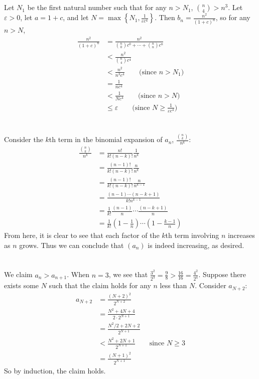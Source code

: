 \documentclass[11pt]{article}
\let\ep\varepsilon
\begin{document}
\renewcommand{\thesubsection}{\thesection.\alph{subsection}}
\section{} %
Let $N_1$ be the first natural number such that for any $n>N_1$, $\binom{n}{4}>n^3$.
Let $\ep>0$, let $a=1+c$, and let $N=\max\left\{N_1, \frac{1}{\ep c^4}\right\}$.
Then $b_n=\frac{n^2}{(1+c)^n}$, so for any $n>N$,
\begin{align*}
	\frac{n^2}{(1+c)^n}&=\frac{n^2}{\binom{n}{0}c^0+\cdots+\binom{n}{n}c^n}\\
					   &<\frac{n^2}{\binom{n}{4}c^4}\\
					   &<\frac{n^2}{n^3c^4}\qquad\text{(since $n>N_1$)}\\
					   &=\frac{1}{nc^4}\\
					   &<\frac{1}{Nc^4}\qquad\text{(since $n>N$)}\\
					   &\le\ep\qquad\text{(since $N\ge\frac{1}{\ep c^4}$)}
\end{align*}


\section{} %
Consider the $k$th term in the binomial expansion of $a_n$, $\frac{\binom{n}{k}}{n^k}$:
\begin{align*}
	\frac{\binom{n}{k}}{n^k}&=\frac{n!}{k!(n-k)!}\frac{1}{n^k}\\
							&=\frac{(n-1)!}{k!(n-k)!}\frac{n}{n^k}\\
							&=\frac{(n-1)!}{k!(n-k)!}\frac{n}{n^{k-1}}\\
							&=\frac{(n-1)\cdots(n-k+1)}{k!n^{k-1}}\\
							&=\frac{1}{k!}\frac{(n-1)}{n}\cdots\frac{(n-k+1)}{n}\\
							&=\frac{1}{k!}\left(1-\frac{1}{n}\right)\cdots\left(1-\frac{k-1}{n}\right)
\end{align*}
From here, it is clear to see that each factor of the $k$th term involving $n$ increases as $n$ grows.
Thus we can conclude that $(a_n)$ is indeed increasing, as desired.


\section{} %
We claim $a_n>a_{n+1}$. When $n=3$, we see that $\frac{3^2}{2^3}=\frac{9}{8}>\frac{16}{16}=\frac{4^2}{2^4}$.
Suppose there exists some $N$ such that the claim holds for any $n$ less than $N$.
Consider $a_{N+2}$:
\begin{align*}
	a_{N+2}&=\frac{(N+2)^2}{2^{N+2}}\\
		   &=\frac{N^2+4N+4}{2\cdot2^{N+1}}\\
		   &=\frac{N^2/2+2N+2}{2^{N+1}}\\
		   &<\frac{N^2+2N+1}{2^{N+1}}\qquad\text{since $N\ge3$}\\
		   &=\frac{(N+1)^2}{2^{N+1}}
\end{align*}
So by induction, the claim holds.
\end{document}
